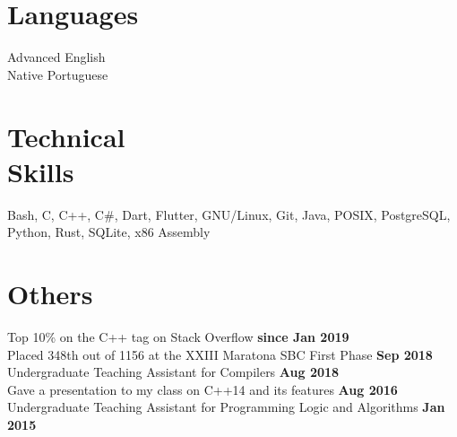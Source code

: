 \documentclass[margin,line]{resume}
\begin{document}
\begin{resume}
    \section{\mysidestyle Languages}

    Advanced English\\
    Native Portuguese

    \section{\mysidestyle Technical\\Skills}

    Bash, C, C++, C\#, Dart, Flutter, GNU/Linux, Git, Java, POSIX, PostgreSQL, Python, Rust, SQLite, x86 Assembly

    \section{\mysidestyle Others}

    Top 10\% on the C++ tag on Stack Overflow \hfill \textbf{since Jan 2019}\\
    Placed 348th out of 1156 at the XXIII Maratona SBC First Phase \hfill \textbf{Sep 2018}\\
    Undergraduate Teaching Assistant for Compilers \hfill \textbf{Aug 2018}\\
    Gave a presentation to my class on C++14 and its features \hfill \textbf{Aug 2016}\\
    Undergraduate Teaching Assistant for Programming Logic and Algorithms \hfill \textbf{Jan 2015}\\

\end{resume}
\end{document}
